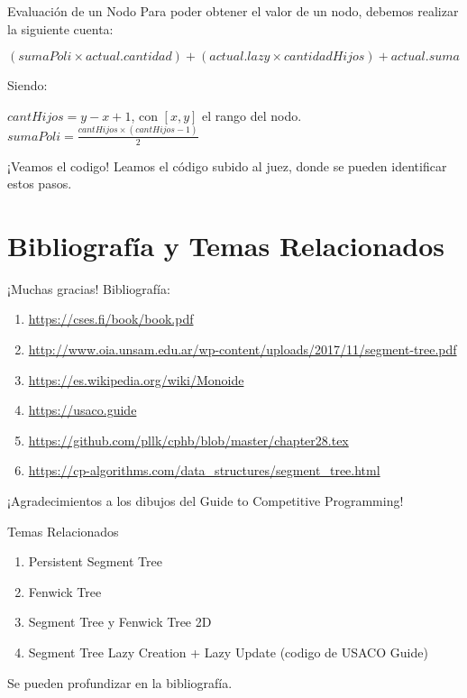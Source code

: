 \documentclass{beamer}
\begin{document}
\begin{frame}{Evaluación de un Nodo}
Para poder obtener el valor de un nodo, debemos realizar la siguiente cuenta:

$(sumaPoli \times actual.cantidad) + (actual.lazy \times cantidadHijos) + actual.suma$

\pause
Siendo:

$cantHijos = y - x + 1$, con $[x,y]$ el rango del nodo.
$sumaPoli = \frac{cantHijos \times (cantHijos-1)}{2}$
\end{frame}

\begin{frame}{¡Veamos el codigo!}
Leamos el código subido al juez, donde se pueden identificar estos pasos.
\end{frame}

\section{Bibliografía y Temas Relacionados}
\begin{frame}{¡Muchas gracias!}
Bibliografía:

\begin{enumerate}
    \item \url{https://cses.fi/book/book.pdf}
    \item \url{http://www.oia.unsam.edu.ar/wp-content/uploads/2017/11/segment-tree.pdf}
    \item \url{https://es.wikipedia.org/wiki/Monoide}
    \item \url{https://usaco.guide}
    \item \url{https://github.com/pllk/cphb/blob/master/chapter28.tex}
    \item \url{https://cp-algorithms.com/data_structures/segment_tree.html}
\end{enumerate}
¡Agradecimientos a los dibujos del Guide to Competitive Programming!
\end{frame}

\begin{frame}{Temas Relacionados}
\begin{enumerate}
    \item Persistent Segment Tree
    \item Fenwick Tree
    \item Segment Tree y Fenwick Tree 2D
    \item Segment Tree Lazy Creation + Lazy Update (codigo de USACO Guide)
\end{enumerate}
Se pueden profundizar en la bibliografía.
\end{frame}
\end{document}
